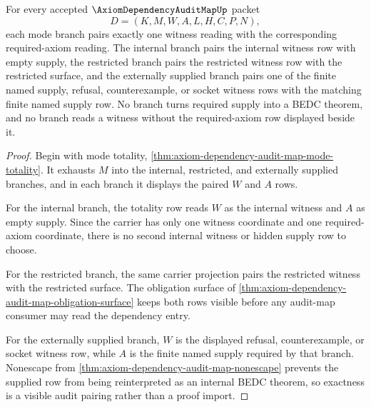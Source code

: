 \begin{theorem}
\label{thm:axiom-dependency-audit-map-witness-required-axiom-exactness}
For every accepted $\AxiomDependencyAuditMapUp$ packet
$$
D=(K,M,W,A,L,H,C,P,N),
$$
each mode branch pairs exactly one witness reading with the corresponding required-axiom reading. The internal branch pairs the internal witness row with empty supply, the restricted branch pairs the restricted witness row with the restricted surface, and the externally supplied branch pairs one of the finite named supply, refusal, counterexample, or socket witness rows with the matching finite named supply row. No branch turns required supply into a BEDC theorem, and no branch reads a witness without the required-axiom row displayed beside it.
\end{theorem}
\begin{proof}
Begin with mode totality, \autoref{thm:axiom-dependency-audit-map-mode-totality}. It exhausts $M$ into the internal, restricted, and externally supplied branches, and in each branch it displays the paired $W$ and $A$ rows.

For the internal branch, the totality row reads $W$ as the internal witness and $A$ as empty supply. Since the carrier has only one witness coordinate and one required-axiom coordinate, there is no second internal witness or hidden supply row to choose.

For the restricted branch, the same carrier projection pairs the restricted witness with the restricted surface. The obligation surface of \autoref{thm:axiom-dependency-audit-map-obligation-surface} keeps both rows visible before any audit-map consumer may read the dependency entry.

For the externally supplied branch, $W$ is the displayed refusal, counterexample, or socket witness row, while $A$ is the finite named supply required by that branch. Nonescape from \autoref{thm:axiom-dependency-audit-map-nonescape} prevents the supplied row from being reinterpreted as an internal BEDC theorem, so exactness is a visible audit pairing rather than a proof import.
\end{proof}

